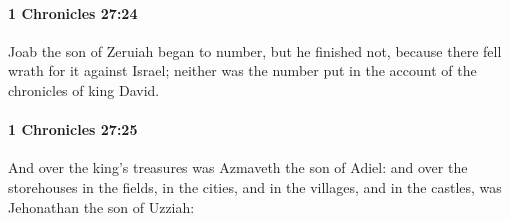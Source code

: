 		\paragraph{1 Chronicles 27:24} %
			\label{1CHRONICLES-27-24}

			Joab the son of Zeruiah began to number, but he finished not, because there fell wrath for it against Israel; neither was the number put in the account of the chronicles of king David.


		\paragraph{1 Chronicles 27:25} %
			\label{1CHRONICLES-27-25}

			And over the king’s treasures was Azmaveth the son of Adiel: and over the storehouses in the fields, in the cities, and in the villages, and in the castles, was Jehonathan the son of Uzziah:

